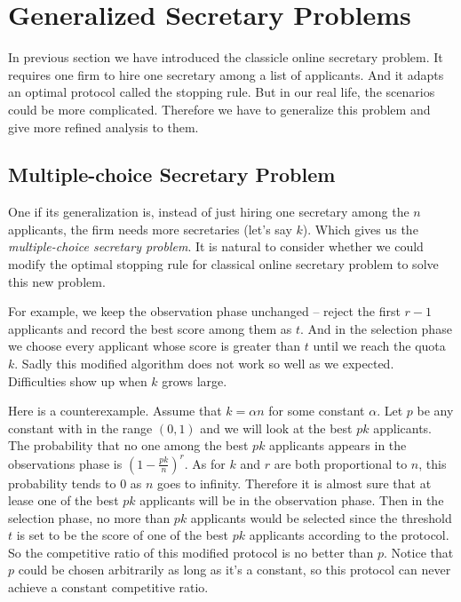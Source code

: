 \section{Generalized Secretary Problems}

In previous section we have introduced the classicle online secretary
problem. It requires one firm to hire one secretary among 
a list of applicants. And it adapts an optimal protocol called the
stopping rule. But in our real life, the scenarios could be more
complicated. Therefore we have to generalize this problem and give more
refined analysis to them.

\subsection{Multiple-choice Secretary Problem}

One if its generalization is, instead of just hiring one secretary among
the $n$ applicants, the firm needs more secretaries (let's say $k$).
Which gives us the \emph{multiple-choice secretary problem}.
It is natural to consider whether we could modify the optimal stopping rule
for classical online secretary problem to solve this new problem.

For example, we keep the observation phase unchanged -- reject the first
$r - 1$ applicants and record the best score among them as $t$. And in
the selection phase we choose every applicant whose score is greater than 
$t$ until we reach the quota $k$. Sadly this modified algorithm does not
work so well as we expected. Difficulties show up when $k$ grows large.

Here is a counterexample. Assume that $k = \alpha n$ for some constant 
$\alpha$. Let $p$ be any constant with in the range $(0, 1)$ and 
we will look at the best $p k$ applicants. The probability that no one
among the best $p k$ applicants appears in the observations phase is
$(1 - \frac{p k}{n})^r$. As for $k$ and $r$ are both proportional to $n$,
this probability tends to 0 as $n$ goes to infinity. Therefore it is almost
sure that at lease one of the best $p k$ applicants will be in the
observation phase. Then in the selection phase, no more than $p k$
applicants would be selected since the threshold $t$ is set to be the score
of one of the best $p k$ applicants according to the protocol.
So the competitive ratio of this modified protocol is no better than $p$.
Notice that $p$ could be chosen arbitrarily as long as it's a constant, 
so this protocol can never achieve a constant competitive ratio.

